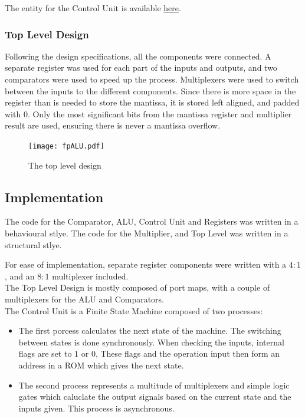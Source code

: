 \documentclass[a4paper,10pt]{article}
\begin{document}
    The entity for the Control Unit is available \hyperref[sec:controlUnit]{here}.

    \newpage
    \subsubsection{Top Level Design}
    Following the design specifications, all the components were connected. A separate register was used for each part of the inputs and outputs, and two comparators were used to speed up the process. Multiplexers were used to switch between the inputs to the different components. Since there is more space in the register than is needed to store the mantissa, it is stored left aligned, and padded with $0$. Only the most significant bits from the mantissa register and multiplier result are used, ensuring there is never a mantissa overflow.

    \begin{figure}[htbp]
    \centering
    \caption{The top level design}
    \texttt{[image: fpALU.pdf]}
    \end{figure}


    \newpage
    \subsection{Implementation}
    The code for the Comparator, ALU, Control Unit and Registers was written in a behavioural stlye. The code for the Multiplier, and Top Level was written in a structural stlye.

    For ease of implementation, separate register components were written with a $4:1$, and an $8:1$ multiplexer included.\\
    The Top Level Design is mostly composed of port maps, with a couple of multiplexers for the ALU and Comparators.\\
    The Control Unit is a Finite State Machine composed of two processes:
    \begin{itemize}
     \item The first porcess calculates the next state of the machine. The switching between states is done synchronously. When checking the inputs, internal flags are set to $1$ or $0$, These flags and the operation input then form an address in a ROM which gives the next state.
     \item The second process represents a multitude of multiplexers and simple logic gates which caluclate the output signals based on the current state and the inputs given. This process is asynchronous.
    \end{itemize}
\end{document}
